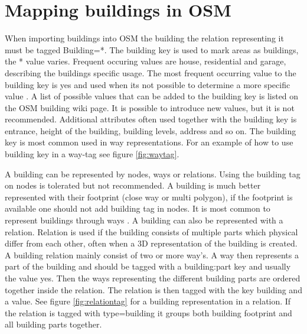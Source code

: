  \section{Mapping buildings in OSM}
When importing buildings into OSM the building the relation representing it must be tagged Building=*. The building key is used to mark areas as buildings, the * value varies. Frequent occuring values are house, residential and garage, describing the buildings specific usage. The most frequent occurring value to the building key is yes and used when its not possible to determine a more specific value \cite{OpenStreetMapf}. A list of possible values that can be added to the building key is listed on the OSM building wiki page. It is possible to introduce new values, but it is not recommended. Additional attributes often used together with the building key is entrance, height of the building, building levels, address and so on. The building key is most common used in way representations. For an example of how to use building key in a way-tag see figure \ref{fig:waytag}.

A building can be represented by nodes, ways or relations. Using the building tag on nodes is tolerated but not recommended. A building is much better represented with their footprint (close way or multi polygon), if the footprint is available one should not add building tag in nodes. It is most common to represent buildings through ways \cite{OpenStreetMapf}. A building can also be represented with a relation. Relation is used if the building consists of multiple parts which physical differ from each other, often when a 3D representation of the building is created. A building relation mainly consist of two or more way's. A way then represents a part of the building and should be tagged with a building:part key and usually the value yes. Then the ways representing the different building parts are ordered together inside the relation. The relation is then tagged with the key building and a value. See figure \ref{fig:relationtag} for a building representation in a relation. If the relation is tagged with type=building it groups both building footprint and all building parts together. 
